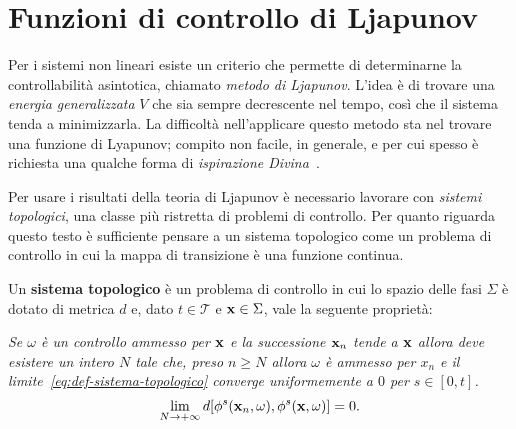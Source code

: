 \section{Funzioni di controllo di Ljapunov}
Per i sistemi non lineari esiste un criterio che permette di determinarne
la controllabilità asintotica, chiamato \emph{metodo di Ljapunov}.
L'idea è di trovare una \emph{energia generalizzata} $V$
che sia sempre decrescente nel tempo,
così che il sistema tenda a minimizzarla.
La difficoltà nell'applicare questo metodo sta nel trovare una funzione di Lyapunov;
compito non facile, in generale, e per cui spesso è richiesta
una qualche forma di \emph{ispirazione Divina}~\cite{strogatz}.


Per usare i risultati della teoria di Ljapunov è necessario lavorare
con \emph{sistemi topologici}, una classe più ristretta di problemi di controllo.
Per quanto riguarda questo testo è sufficiente pensare a un sistema topologico
come un problema di controllo in cui la mappa di transizione è una funzione
continua.

\begin{definition}
    Un \textbf{sistema topologico} è un problema di controllo in
    cui lo spazio delle fasi $\Sigma$ è dotato di metrica $d$ e,
    dato $t \in \mathcal T$ e $\mathbf{x} \in \Sigma$,
    vale la seguente proprietà:

    \emph{Se $\omega$ è un controllo ammesso per $\mathbf{x}$ e la successione
    ${\mathbf{x}_n}$ tende a $\mathbf{x}$ allora deve esistere un intero
    $N$ tale che, preso $n \geq N$ allora $\omega$ è ammesso per $x_n$
    e il limite~\eqref{eq:def-sistema-topologico} converge uniformemente a $0$ per $s \in [0, t]$.}
    \begin{equation}
        \lim_{N \to +\infty} d[\phi^s(\mathbf{x}_n, \omega), \phi^s(\mathbf{x}, \omega)] = 0.
        \label{eq:def-sistema-topologico}
    \end{equation}
\end{definition}


